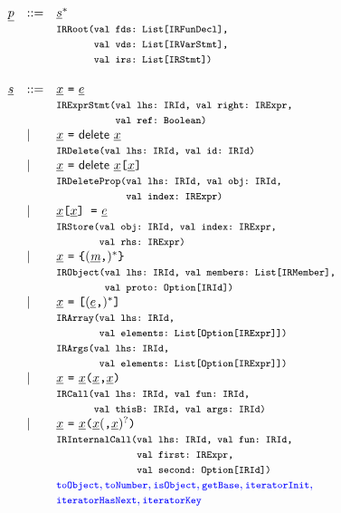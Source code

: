 \[
\begin{array}{llll}
\ir\pgm & ::= & \ir\stmt^* \\
&& \mtt{IRRoot(val fds:~List[IRFunDecl],}\\
&&\mtt{\phantom{IRRoot(}val vds:~List[IRVarStmt],}\\
&&\mtt{\phantom{IRRoot(}val irs:~List[IRStmt])}\\\\

\ir\stmt & ::= & \irid \ \verb+=+ \ \ir\expr \\
&& \mtt{IRExprStmt(val lhs:~IRId, val right:~IRExpr,}\\
&&\mtt{\phantom{IRExprStmt(}val ref:~Boolean)}\\
&\mid& \irid \ \verb+=+ \ {\sf delete}\ \irid\\
&& \mtt{IRDelete(val lhs:~IRId, val id:~IRId)}\\
&\mid& \irid \ \verb+=+ \ {\sf delete}\ \irid\verb+[+\irid\verb+]+\\
&& \mtt{IRDeleteProp(val lhs:~IRId, val obj:~IRId,}\\
&&\mtt{\phantom{IRDeleteProp(}val index:~IRExpr)}\\
&\mid& \irid\verb+[+\irid\verb+] =+ \ \irexpr \\
&& \mtt{IRStore(val obj:~IRId, val index:~IRExpr,}\\
&&\mtt{\phantom{IRStore(}val rhs:~IRExpr)}\\
 &\mid& \irid \ \verb+=+ \ \verb+{+ (\ir\member\verb+,+)^* \verb+}+\\
&& \mtt{IRObject(val lhs:~IRId, val members:~List[IRMember],}\\
&&\mtt{\phantom{IRObject(}val proto:~Option[IRId])}\\
 &\mid& \irid \ \verb+=+ \ \verb+[+ (\irexpr\verb+,+)^* \verb+]+ \\
&& \mtt{IRArray(val lhs:~IRId,}\\
&&\mtt{\phantom{IRArray(}val elements:~List[Option[IRExpr]])}\\
&&\mtt{IRArgs(val lhs:~IRId,}\\
&&\mtt{\phantom{IRArray(}val elements:~List[Option[IRExpr]])}\\
 &\mid& \irid \ \verb+=+ \ \irid\verb+(+\irid\verb+,+\irid\verb+)+\\
&& \mtt{IRCall(val lhs:~IRId, val fun:~IRId,}\\
&&\mtt{\phantom{IRCall(}val thisB:~IRId, val args:~IRId)}\\
 &\mid& \irid \ \verb+=+ \ \irid\verb+(+\irid(\verb+,+\irid)^?\verb+)+\\
&& \mtt{IRInternalCall(val lhs:~IRId, val fun:~IRId,}\\
&&\mtt{\phantom{IRInternalCall(}val first:~IRExpr,}\\
&&\mtt{\phantom{IRInternalCall(}val second:~Option[IRId])}\\
&&{\inblue \mtt{toObject}, \mtt{toNumber}, \mtt{isObject},
\mtt{getBase}, \mtt{iteratorInit},}\\
&&{\inblue \mtt{iteratorHasNext}, \mtt{iteratorKey}}\\


\end{array}\]
